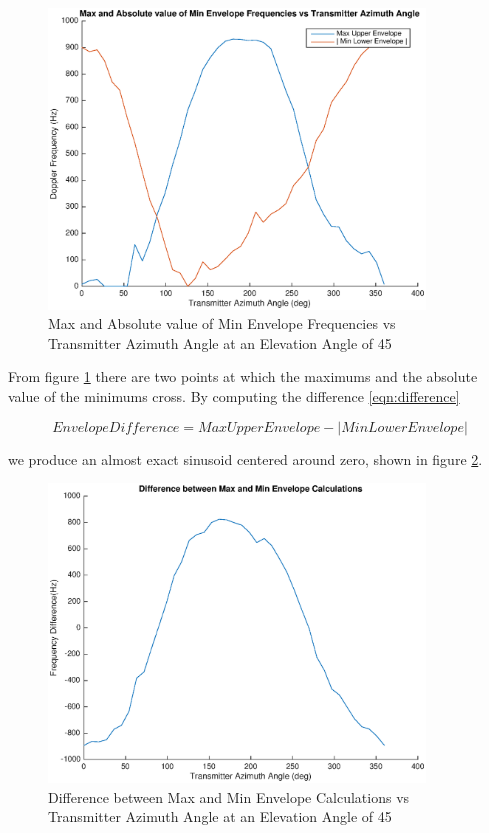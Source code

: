 \begin{figure}
	\begin{center}
		\includegraphics[width=10cm]{images/results/Azimuth_angle_estimation_max_vs_absMin.eps}
		\caption{Max and Absolute value of Min Envelope Frequencies vs Transmitter Azimuth Angle at an Elevation Angle of 45\textdegree}
		\label{fig:azimuth_estimation_max_vs_absMin}
	\end{center}
\end{figure}

From figure \ref{fig:azimuth_estimation_max_vs_absMin} there are two points at which the maximums and the absolute value of the minimums cross. By computing the difference \ref{eqn:difference}

\begin{equation}
	 Envelope Difference = Max Upper Envelope - | Min Lower Envelope |
	 \label{eqn:difference}
\end{equation}

we produce an almost exact sinusoid centered around zero, shown in figure \ref{fig:azimuth_estimation_difference}.

 \begin{figure}[b]
	\begin{center}
		\includegraphics[width=10cm]{images/results/Azimuth_angle_estimation_difference.eps}
		\caption{Difference between Max and Min Envelope Calculations vs Transmitter Azimuth Angle at an Elevation Angle of 45\textdegree}
		\label{fig:azimuth_estimation_difference}
	\end{center}
\end{figure}

